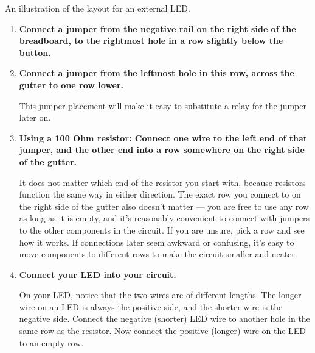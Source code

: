 \begin{marginfigure}[-8cm]
\begin{center}
		\caption[External LED layout]{An illustration of the layout for an external LED. }
	\end{center}
\end{marginfigure}


\begin{enumerate}
	\item \textbf{Connect a jumper from the negative rail on the right side of the breadboard, to the rightmost hole in a row slightly below the button.}
	\item \textbf{Connect a jumper from the leftmost hole in this row, across the gutter to one row lower.}
	
	This jumper placement will make it easy to substitute a relay for the jumper later on. 
	\item \textbf{Using a 100 Ohm resistor: Connect one wire to the left end of that jumper, and the other end into a row somewhere on the right side of the gutter.} 
	
	It does not matter which end of the resistor you start with, because resistors function the same way in either direction. 
	The exact row you connect to on the right side of the gutter also doesn't matter --- you are free to use any row as long as it is empty, and it's reasonably convenient to connect with jumpers to the other components in the circuit. 
	If you are unsure, pick a row and see how it works. 
	If connections later seem awkward or confusing, it's easy to move components to different rows to make the circuit smaller and neater.
	
	
	
	\item \textbf{Connect your LED into your circuit.}
	
	On your LED, notice that the two wires are of different lengths. The longer wire on an LED is always the positive side, and the shorter wire is the negative side. Connect the negative (shorter) LED wire to another hole in the same row as the resistor. Now connect the positive (longer) wire on the LED to an empty row. 
	

\end{enumerate}
